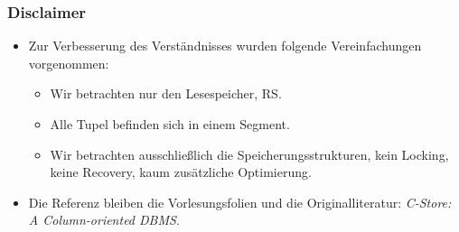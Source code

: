 \begin{frame}
\frametitle{Disclaimer}
\begin{itemize}
	\item Zur Verbesserung des Verst\"andnisses wurden folgende Vereinfachungen vorgenommen:
	\begin{itemize}
		\item Wir betrachten nur den Lesespeicher, RS.
		\item Alle Tupel befinden sich in einem Segment.
		\item Wir betrachten ausschlie\ss{}lich die Speicherungsstrukturen, kein Locking, keine Recovery, kaum zus\"atzliche Optimierung.
	\end{itemize}
	\item Die Referenz bleiben die Vorlesungsfolien und die Originalliteratur: \textit{C-Store: A Column-oriented DBMS}.
\end{itemize}
\end{frame} 
